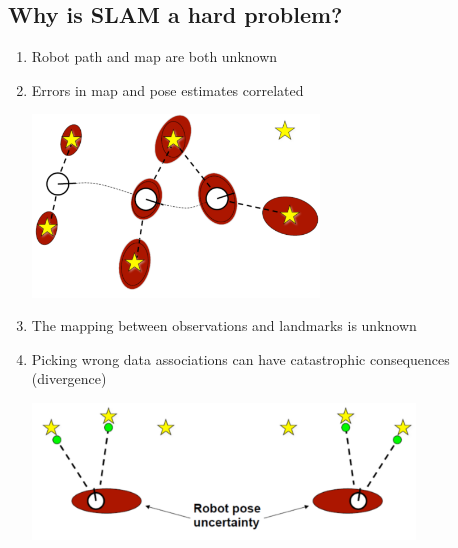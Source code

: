 \documentclass[10pt]{article}
\begin{document}
\subsection*{Why is SLAM a hard problem?}
\begin{enumerate}
    \item Robot path and map are both unknown
    \item Errors in map and pose estimates correlated
    \begin{center} 
        \includegraphics*[width=0.6\textwidth]{L2_2.png} 
    \end{center}
    \item The mapping between observations and landmarks is unknown
    \item Picking wrong data associations can have catastrophic consequences (divergence)
    \begin{center} 
        \includegraphics*[width=0.8\textwidth]{L2_3.png} 
    \end{center}
\end{enumerate}
\end{document}
